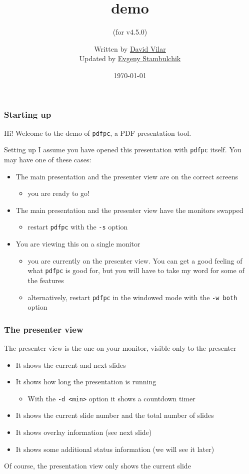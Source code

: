 \documentclass{beamer}
\title{\pdfpc demo}
\subtitle{(for v4.5.0)}
\author[D. Vilar \& E. Stambulchik]{Written by
                  \href{https://github.com/davvil}{David Vilar} \\
                  Updated by
                  \href{https://github.com/fnevgeny}{Evgeny Stambulchik}}
\date{\today}
\institute{}
\newcommand{\singleitem}[1]{\begin{itemize}\item #1\end{itemize}}
\newcommand{\pdfpc}{\texttt{pdfpc}\xspace}
\newcommand{\opt}[1]{\texttt{#1}\xspace}
\begin{document}
\begin{frame}
  \titlepage
  \hypertarget{titlePage}{}
\end{frame}

\begin{frame}
  \frametitle{Starting up}
  Hi! Welcome to the demo of \pdfpc, a PDF presentation tool.
  \begin{block}{Setting up}
    I assume you have opened this presentation with \pdfpc itself. You may have
    one of these cases:
    \begin{itemize}
      \item The main presentation and the presenter view are on the correct
        screens
          \singleitem{you are ready to go!}
      \item The main presentation and the presenter view have the monitors
        swapped
          \singleitem{restart \pdfpc with the \opt{-s} option}
      \item You are viewing this on a single monitor
        \begin{itemize}
          \item you are currently on the presenter view. You can get a
            good feeling of what \pdfpc is good for, but you will have to take
            my word for some of the features
          \item alternatively, restart \pdfpc in the windowed mode with the
            \opt{-w~both} option
        \end{itemize}
    \end{itemize}
  \end{block}
\end{frame}

\begin{frame}
  \frametitle{The presenter view}
  The presenter view is the one on your monitor, visible only to the presenter
  \begin{itemize}
    \item It shows the current and next slides
    \item It shows how long the presentation is running
      \singleitem{With the \opt{-d <min>} option it shows a countdown timer}
    \item It shows the current slide number and the total number of slides
    \item It shows overlay information (see next slide)
    \item It shows some additional status information (we will see it later)
  \end{itemize}
  Of course, the presentation view only shows the current slide
\end{frame}
\end{document}
